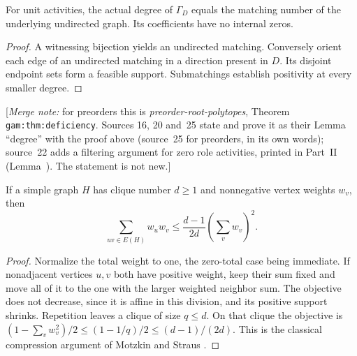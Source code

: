 \documentclass[11pt]{article}
\makeatletter
\numberwithin{equation}{section}
\theoremstyle{definition}\newtheorem{definition}[theorem]{Definition}\newtheorem{remark}[theorem]{Remark}
\newcommand{\Ga}{\Gamma}                   %
\newcommand{\mnote}[1]{[\textit{Merge note:} #1]}
\newcommand{\prp}{\emph{preorder-root-polytopes}}
\newcommand{\pgrfwd}[2]{\@ifundefined{r@#1}{#2}{\ref{#1}}}
\makeatother
\begin{document}
\begin{lemma}\label{pgr:lem:degree}
For unit activities, the actual degree of $\Ga_D$ equals the matching number
of the underlying undirected graph. Its coefficients have no internal
zeros.
\end{lemma}
\begin{proof}
A witnessing bijection yields an undirected matching. Conversely orient each
edge of an undirected matching in a direction present in $D$. Its disjoint
endpoint sets form a feasible support. Submatchings establish positivity at
every smaller degree.
\end{proof}
\mnote{for preorders this is \prp, Theorem \texttt{gam:thm:deficiency}.
Sources 16, 20 and~25 state and prove it as their Lemma ``degree'' with the
proof above (source~25 for preorders, in its own words); source~22 adds a
filtering argument for zero role activities, printed in Part~II
(Lemma~\pgrfwd{pgr:r:ir:lem:degree}{of source~22}). The
statement is not new.}

\begin{lemma}\label{pgr:lem:ms}
If a simple graph $H$ has clique number $d\ge1$ and nonnegative vertex
weights $w_v$, then
\[
 \sum_{uv\in E(H)}w_uw_v\le\frac{d-1}{2d}\left(\sum_vw_v\right)^2.
\]
\end{lemma}
\begin{proof}
Normalize the total weight to one, the zero-total case being immediate. If
nonadjacent vertices $u,v$ both have positive weight, keep their sum fixed
and move all of it to the one with the larger weighted neighbor sum. The
objective does not decrease, since it is affine in this division, and its
positive support shrinks. Repetition leaves a clique of size $q\le d$. On
that clique the objective is $(1-\sum_vw_v^2)/2\le(1-1/q)/2\le(d-1)/(2d)$.
This is the classical compression argument of Motzkin and Straus
\cite{MS}.
\end{proof}
\end{document}
